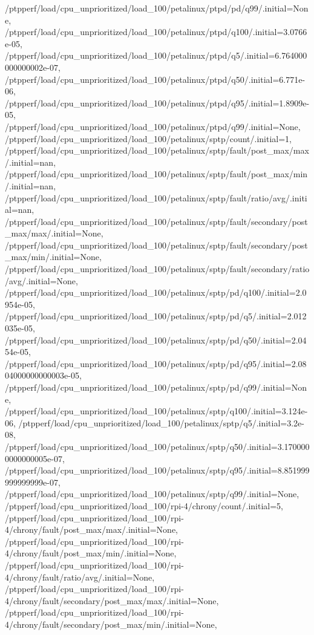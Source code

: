 {    /ptpperf/load/cpu_unprioritized/load_100/petalinux/ptpd/pd/q99/.initial=None,
    /ptpperf/load/cpu_unprioritized/load_100/petalinux/ptpd/q100/.initial=3.0766e-05,
    /ptpperf/load/cpu_unprioritized/load_100/petalinux/ptpd/q5/.initial=6.764000000000002e-07,
    /ptpperf/load/cpu_unprioritized/load_100/petalinux/ptpd/q50/.initial=6.771e-06,
    /ptpperf/load/cpu_unprioritized/load_100/petalinux/ptpd/q95/.initial=1.8909e-05,
    /ptpperf/load/cpu_unprioritized/load_100/petalinux/ptpd/q99/.initial=None,
    /ptpperf/load/cpu_unprioritized/load_100/petalinux/sptp/count/.initial=1,
    /ptpperf/load/cpu_unprioritized/load_100/petalinux/sptp/fault/post_max/max/.initial=nan,
    /ptpperf/load/cpu_unprioritized/load_100/petalinux/sptp/fault/post_max/min/.initial=nan,
    /ptpperf/load/cpu_unprioritized/load_100/petalinux/sptp/fault/ratio/avg/.initial=nan,
    /ptpperf/load/cpu_unprioritized/load_100/petalinux/sptp/fault/secondary/post_max/max/.initial=None,
    /ptpperf/load/cpu_unprioritized/load_100/petalinux/sptp/fault/secondary/post_max/min/.initial=None,
    /ptpperf/load/cpu_unprioritized/load_100/petalinux/sptp/fault/secondary/ratio/avg/.initial=None,
    /ptpperf/load/cpu_unprioritized/load_100/petalinux/sptp/pd/q100/.initial=2.0954e-05,
    /ptpperf/load/cpu_unprioritized/load_100/petalinux/sptp/pd/q5/.initial=2.012035e-05,
    /ptpperf/load/cpu_unprioritized/load_100/petalinux/sptp/pd/q50/.initial=2.0454e-05,
    /ptpperf/load/cpu_unprioritized/load_100/petalinux/sptp/pd/q95/.initial=2.0804000000000003e-05,
    /ptpperf/load/cpu_unprioritized/load_100/petalinux/sptp/pd/q99/.initial=None,
    /ptpperf/load/cpu_unprioritized/load_100/petalinux/sptp/q100/.initial=3.124e-06,
    /ptpperf/load/cpu_unprioritized/load_100/petalinux/sptp/q5/.initial=3.2e-08,
    /ptpperf/load/cpu_unprioritized/load_100/petalinux/sptp/q50/.initial=3.1700000000000005e-07,
    /ptpperf/load/cpu_unprioritized/load_100/petalinux/sptp/q95/.initial=8.851999999999999e-07,
    /ptpperf/load/cpu_unprioritized/load_100/petalinux/sptp/q99/.initial=None,
    /ptpperf/load/cpu_unprioritized/load_100/rpi-4/chrony/count/.initial=5,
    /ptpperf/load/cpu_unprioritized/load_100/rpi-4/chrony/fault/post_max/max/.initial=None,
    /ptpperf/load/cpu_unprioritized/load_100/rpi-4/chrony/fault/post_max/min/.initial=None,
    /ptpperf/load/cpu_unprioritized/load_100/rpi-4/chrony/fault/ratio/avg/.initial=None,
    /ptpperf/load/cpu_unprioritized/load_100/rpi-4/chrony/fault/secondary/post_max/max/.initial=None,
    /ptpperf/load/cpu_unprioritized/load_100/rpi-4/chrony/fault/secondary/post_max/min/.initial=None,
}
